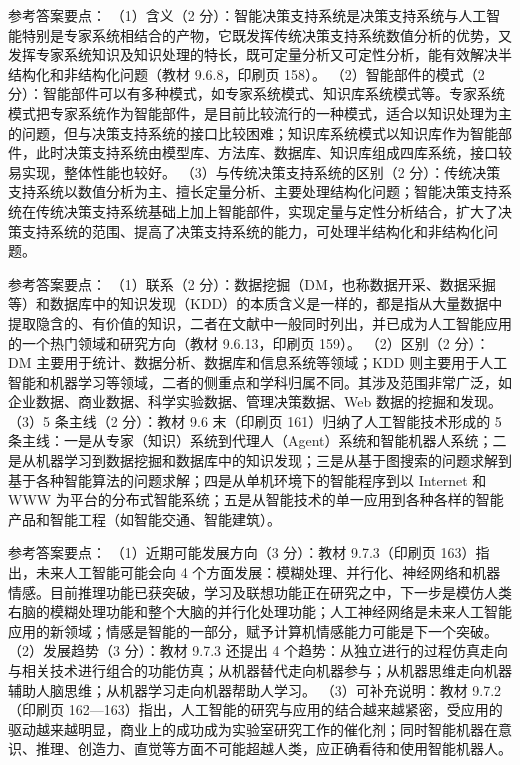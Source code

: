 \documentclass[a4paper,11pt]{article}
\begin{document}
\q 参考答案要点：
（1）含义（2 分）：智能决策支持系统是决策支持系统与人工智能特别是专家系统相结合的产物，它既发挥传统决策支持系统数值分析的优势，又发挥专家系统知识及知识处理的特长，既可定量分析又可定性分析，能有效解决半结构化和非结构化问题（教材 9.6.8，印刷页 158）。
（2）智能部件的模式（2 分）：智能部件可以有多种模式，如专家系统模式、知识库系统模式等。专家系统模式把专家系统作为智能部件，是目前比较流行的一种模式，适合以知识处理为主的问题，但与决策支持系统的接口比较困难；知识库系统模式以知识库作为智能部件，此时决策支持系统由模型库、方法库、数据库、知识库组成四库系统，接口较易实现，整体性能也较好。
（3）与传统决策支持系统的区别（2 分）：传统决策支持系统以数值分析为主、擅长定量分析、主要处理结构化问题；智能决策支持系统在传统决策支持系统基础上加上智能部件，实现定量与定性分析结合，扩大了决策支持系统的范围、提高了决策支持系统的能力，可处理半结构化和非结构化问题。

\q 参考答案要点：
（1）联系（2 分）：数据挖掘（DM，也称数据开采、数据采掘等）和数据库中的知识发现（KDD）的本质含义是一样的，都是指从大量数据中提取隐含的、有价值的知识，二者在文献中一般同时列出，并已成为人工智能应用的一个热门领域和研究方向（教材 9.6.13，印刷页 159）。
（2）区别（2 分）：DM 主要用于统计、数据分析、数据库和信息系统等领域；KDD 则主要用于人工智能和机器学习等领域，二者的侧重点和学科归属不同。其涉及范围非常广泛，如企业数据、商业数据、科学实验数据、管理决策数据、Web 数据的挖掘和发现。
（3）5 条主线（2 分）：教材 9.6 末（印刷页 161）归纳了人工智能技术形成的 5 条主线：一是从专家（知识）系统到代理人（Agent）系统和智能机器人系统；二是从机器学习到数据挖掘和数据库中的知识发现；三是从基于图搜索的问题求解到基于各种智能算法的问题求解；四是从单机环境下的智能程序到以 Internet 和 WWW 为平台的分布式智能系统；五是从智能技术的单一应用到各种各样的智能产品和智能工程（如智能交通、智能建筑）。

\q 参考答案要点：
（1）近期可能发展方向（3 分）：教材 9.7.3（印刷页 163）指出，未来人工智能可能会向 4 个方面发展：模糊处理、并行化、神经网络和机器情感。目前推理功能已获突破，学习及联想功能正在研究之中，下一步是模仿人类右脑的模糊处理功能和整个大脑的并行化处理功能；人工神经网络是未来人工智能应用的新领域；情感是智能的一部分，赋予计算机情感能力可能是下一个突破。
（2）发展趋势（3 分）：教材 9.7.3 还提出 4 个趋势：从独立进行的过程仿真走向与相关技术进行组合的功能仿真；从机器替代走向机器参与；从机器思维走向机器辅助人脑思维；从机器学习走向机器帮助人学习。
（3）可补充说明：教材 9.7.2（印刷页 162—163）指出，人工智能的研究与应用的结合越来越紧密，受应用的驱动越来越明显，商业上的成功成为实验室研究工作的催化剂；同时智能机器在意识、推理、创造力、直觉等方面不可能超越人类，应正确看待和使用智能机器人。
\end{document}
